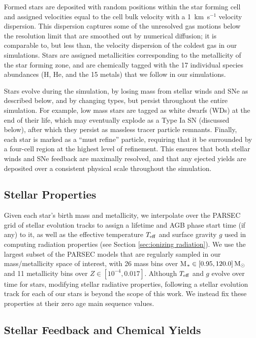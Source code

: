 \documentclass[twocolumn]{aastex61}
\begin{document}
Formed stars are deposited with random positions within the star forming cell and assigned velocities equal to the cell bulk velocity with a 1~km~s$^{-1}$ velocity dispersion. This dispersion captures some of the unresolved gas motions below the resolution limit that are smoothed out by numerical diffusion; it is comparable to, but less than, the velocity dispersion of the coldest gas in our simulations. Stars are assigned metallicities corresponding to the metallicity of the star forming zone, and are chemically tagged with the 17 individual species abundances (H, He, and the 15 metals) that we follow in our simulations. 

Stars evolve during the simulation, by losing mass from stellar winds and SNe as described below, and by changing types, but persist throughout the entire simulation. For example, low mass stars are tagged as white dwarfs (WDs) at the end of their life, which may eventually explode as a Type Ia SN (discussed below), after which they persist as massless tracer particle remnants. Finally, each star is marked as a ``must refine'' particle, requiring that it be surrounded by a four-cell region at the highest level of refinement. This ensures that both stellar winds and SNe feedback are maximally resolved, and that any ejected yields are deposited over a consistent physical scale throughout the simulation.

\subsection{Stellar Properties}
\label{sec:properties}
Given each star's birth mass and metallicity, we interpolate over the PARSEC grid of stellar evolution tracks \citep{Bressan2012} to assign a lifetime and AGB phase start time (if any) to it, as well as the effective temperature $T_{\rm eff}$ and surface gravity $g$ used in computing radiation properties (see Section \ref{sec:ionizing radiation}). We use the largest subset of the PARSEC models that are regularly sampled in our mass/metallicity space of interest, with 26 mass bins over M$_{*} \in \left[0.95, 120.0 \right] {\rm M_{\odot}}$ and 11 metallicity bins over $Z \in \left[10^{-4}, 0.017 \right]$. Although $T_{\rm eff}$ and $g$ evolve over time for stars, modifying stellar radiative properties, following a stellar evolution track for each of our stars is beyond the scope of this work. We instead fix these properties at their zero age main sequence values.

\subsection{Stellar Feedback and Chemical Yields}
\end{document}
